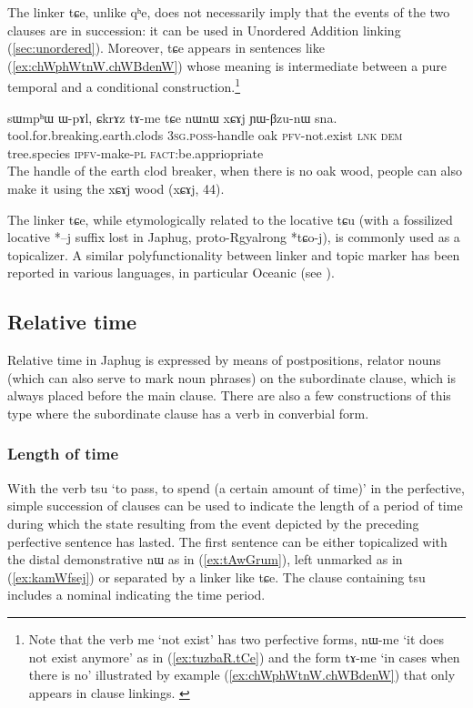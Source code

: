 \documentclass[oldfontcommands,oneside,a4paper,11pt]{article}
\newcommand{\ipa}[1]{{\phon \mbox{#1}}} %
\newcommand{\refb}[1]{(\ref{#1})}
\begin{document}
 The linker \ipa{tɕe}, unlike \ipa{qʰe},  does not necessarily imply that the events of the two clauses are in succession: it can be used in Unordered Addition linking \refb{sec:unordered}. Moreover,  \ipa{tɕe}  appears in sentences like \refb{ex:chWphWtnW.chWBdenW} whose meaning is intermediate between a pure temporal and a conditional construction.\footnote{Note that the verb \ipa{me} `not exist' has two perfective forms,  \ipa{nɯ-me} `it does not exist anymore' as in \refb{ex:tuzbaR.tCe} and the   form \ipa{tɤ-me} `in cases when there is no' illustrated by example \refb{ex:chWphWtnW.chWBdenW} that only appears in clause linkings. \label{ft:tAme}}

\begin{exe}
\ex \label{ex:chWphWtnW.chWBdenW}
\gll 
   	\ipa{sɯmpʰɯ}  	\ipa{ɯ-pɤl,}  	\ipa{ɕkrɤz}  	\ipa{tɤ-me}  	\ipa{tɕe}  	\ipa{nɯnɯ}  	\ipa{xɕɤj}  	\ipa{ɲɯ-βzu-nɯ}  	\ipa{sna.}  \\
   	tool.for.breaking.earth.clods \textsc{3sg.poss}-handle oak \textsc{pfv}-not.exist \textsc{lnk} \textsc{dem} tree.species \textsc{ipfv}-make-\textsc{pl} \textsc{fact}:be.appriopriate \\
\glt The handle of the earth clod breaker, when there is no oak wood, people can also make it using the xɕɤj wood (xɕɤj, 44).
\end{exe}
 
 The linker \ipa{tɕe}, while etymologically related to the locative \ipa{tɕu} (with a fossilized locative *\ipa{--j} suffix lost in Japhug, proto-Rgyalrong *\ipa{tɕo-j}), is commonly used as a topicalizer. A similar polyfunctionality between linker and topic marker has been reported in various languages, in particular Oceanic   (see  \citealt{bril10oceanic}).
  
\subsection{Relative time} \label{sec:relative.time}
Relative time in Japhug is expressed by means of postpositions, relator nouns (which can also serve to mark noun phrases) on the subordinate clause, which is always placed before the main clause. There are also a few constructions of this type where the subordinate clause has a verb in converbial form. 





 \subsubsection{Length of time}
With the verb \ipa{tsu} `to pass, to spend (a certain amount of time)' in the perfective, simple succession of clauses can be used to indicate the length of a period of time during which the state resulting from the event depicted by the preceding perfective sentence has lasted.  The first sentence can be either topicalized with the distal demonstrative \ipa{nɯ} as in \refb{ex:tAwGrum}, left unmarked as in \refb{ex:kamWfsej} or separated by a linker like \ipa{tɕe}. The clause containing \ipa{tsu} includes a nominal indicating the time period.
\end{document}
